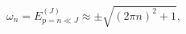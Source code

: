 \begin{equation}\label{zero}
  \omega_n=E^{(J)}_{p=n\ll J}\approx \pm\sqrt{(2\pi n)^2+1},
\end{equation}

